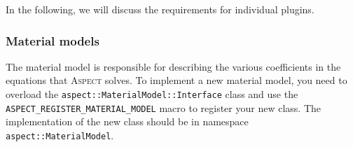 \documentclass{article}
\newcommand{\aspect}{\textsc{Aspect}}
\begin{document}
In the following, we will discuss the requirements for individual plugins.


\subsubsection{Material models}
\label{sec:material-models}

The material model is responsible for describing the various coefficients in
the equations that \aspect{} solves. To implement a new material model, you
need to overload the \texttt{aspect::MaterialModel::Interface} class and use
the \texttt{ASPECT\_REGISTER\_MATERIAL\_MODEL} macro to register your new
class. The implementation of the new class should be in namespace
\texttt{aspect::MaterialModel}.
\end{document}
